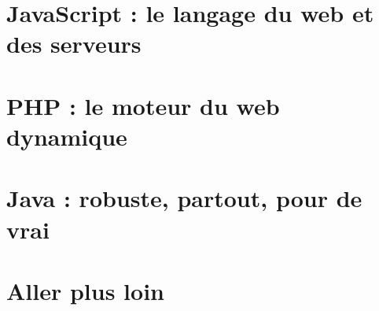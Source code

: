 \documentclass[12pt,a4paper,twoside,openright]{book}
\begin{document}
\mainmatter




\part{JavaScript : le langage du web et des serveurs}

















\part{PHP : le moteur du web dynamique}










\part{Java : robuste, partout, pour de vrai}












\part{Aller plus loin}



\backmatter


\end{document}
